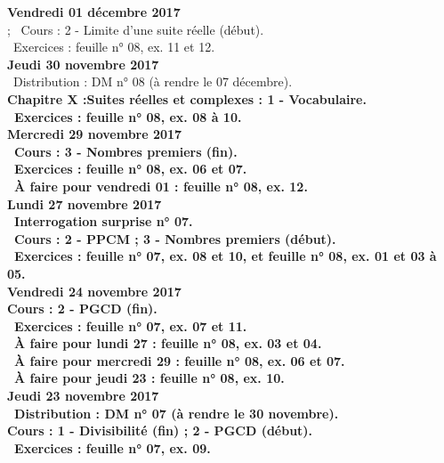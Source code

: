 \documentclass[12pt,a4paper]{article}
\begin{document}
\noindent\textbf{Vendredi 01 décembre 2017}\\ ; 
\bu\ Cours : 2 - Limite d'une suite réelle (début).\\
\bu\ Exercices : feuille n° 08, ex. 11 et 12.\vspace{.4cm}\\

\noindent\textbf{Jeudi 30 novembre 2017}\\
\bu\ Distribution : DM n° 08 (à rendre le 07 décembre).\\
\bf Chapitre X :\rm Suites réelles et complexes : 1 - Vocabulaire.\\
\bu\ Exercices : feuille n° 08, ex. 08 à 10.\vspace{.4cm}\\

\noindent\textbf{\bf Mercredi 29 novembre 2017}\\
\bu\ Cours : 3 - Nombres premiers (fin).\\
\bu\ Exercices : feuille n° 08, ex. 06 et 07.\\
\bu\ À faire pour vendredi 01 : feuille n° 08, ex. 12.\vspace{.4cm}\\

\noindent\textbf{Lundi 27 novembre 2017}\\
\bu\ Interrogation surprise n° 07.\\
\bu\ Cours : 2 - PPCM ; 3 - Nombres premiers (début).\\
\bu\ Exercices : feuille n° 07, ex. 08 et 10, et feuille n° 08, ex. 01 et 03 à 05.\vspace{.4cm}\\

\noindent\textbf{Vendredi 24 novembre 2017}\\
\bf Cours : 2 - PGCD (fin).\\
\bu\ Exercices : feuille n° 07, ex. 07 et 11.\\
\bu\ À faire pour lundi 27 : feuille n° 08, ex. 03 et 04.\\
\bu\ À faire pour mercredi 29 : feuille n° 08, ex. 06 et 07.\\
\bu\ À faire pour jeudi 23 : feuille n° 08, ex. 10.\vspace{.4cm}\\

\noindent\textbf{Jeudi 23 novembre 2017}\\
\bu\ Distribution : DM n° 07 (à rendre le 30 novembre).\\
\bf Cours : 1 - Divisibilité (fin) ; 2 - PGCD (début).\\
\bu\ Exercices : feuille n° 07, ex. 09.\\
\end{document}
